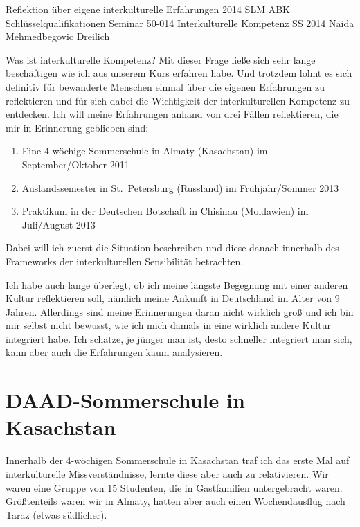 \documentclass{../../sem_paper}
\begin{document}
\titlepg
{Reflektion über eigene interkulturelle Erfahrungen}
{2014}
{SLM ABK Schlüsselqualifikationen}
{Seminar 50-014 Interkulturelle Kompetenz}
{SS 2014}
{Naida Mehmedbegovic Dreilich}

\tocpaper


Was ist interkulturelle Kompetenz? Mit dieser Frage ließe sich sehr lange beschäftigen wie ich aus unserem Kurs erfahren habe. 
Und trotzdem lohnt es sich definitiv für bewanderte Menschen einmal über die eigenen Erfahrungen zu reflektieren und für sich dabei die Wichtigkeit der interkulturellen Kompetenz zu entdecken. 
Ich will meine Erfahrungen anhand von drei Fällen reflektieren, die mir in Erinnerung geblieben sind:
\begin{enumerate}
 \item Eine 4-wöchige Sommerschule in Almaty (Kasachstan) im September/Oktober 2011
  \item Auslandssemester in St.\ Petersburg (Russland) im Frühjahr/Sommer 2013
  \item Praktikum in der Deutschen Botschaft in Chisinau (Moldawien) im Juli/August 2013
\end{enumerate}

Dabei will ich zuerst die Situation beschreiben und diese danach innerhalb des Frameworks der interkulturellen Sensibilität betrachten.

Ich habe auch lange überlegt, ob ich meine längste Begegnung mit einer anderen Kultur reflektieren soll, nämlich meine Ankunft in Deutschland im Alter von 9 Jahren. 
Allerdings sind meine Erinnerungen daran nicht wirklich groß und ich bin mir selbst nicht bewusst, wie ich mich damals in eine wirklich andere Kultur integriert habe. Ich schätze, je jünger man ist, desto schneller integriert man sich, kann aber auch die Erfahrungen kaum analysieren.

\section{DAAD-Sommerschule in Kasachstan}
Innerhalb der 4-wöchigen Sommerschule in Kasachstan traf ich das erste Mal auf interkulturelle Missverständnisse, lernte diese aber auch zu relativieren. 
Wir waren eine Gruppe von 15 Studenten, die in Gastfamilien untergebracht waren. 
Größtenteils waren wir in Almaty, hatten aber auch einen Wochendausflug nach Taraz (etwas südlicher). 
\end{document}
